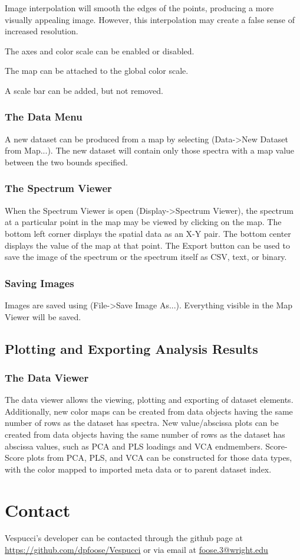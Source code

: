 \documentclass[12pt]{achemso} %
\begin{document}
Image interpolation will smooth the edges of the points, producing a more
visually appealing image. However, this interpolation may create a false sense
of increased resolution.

The axes and color scale can be enabled or disabled.

The map can be attached to the global color scale.

A scale bar can be added, but not removed.

\subsubsection{The Data Menu} A new dataset can be produced from a map by
selecting (Data->New Dataset from Map...). The new dataset will contain only
those spectra with a map value between the two bounds specified.

\subsubsection{The Spectrum Viewer} When the Spectrum Viewer is open
(Display->Spectrum Viewer), the spectrum at a particular point in the map may be
viewed by clicking on the map. The bottom left corner displays the spatial data
as an X-Y pair. The bottom center displays the value of the map at that point.
The Export button can be used to save the image of the spectrum or the spectrum
itself as CSV, text, or binary. 

\subsubsection{Saving Images} Images are saved
using (File->Save Image As...). Everything visible in the Map Viewer will be
saved.

\subsection{Plotting and Exporting Analysis Results}
\subsubsection{The Data Viewer}
The data viewer allows the viewing, plotting and exporting of dataset elements. Additionally, 
new color maps can be created from data objects having the same number of rows as the dataset has spectra.
 New value/abscissa plots can be created from data objects having the same number of rows as the dataset has 
abscissa values, such as PCA and PLS loadings and VCA endmembers.
 Score-Score plots from PCA, PLS, and VCA can be constructed for those data types, with the color mapped to 
imported meta data or to parent dataset index. 

\section{Contact}
Vespucci's developer can be contacted through the github page at \url{https://github.com/dpfoose/Vespucci} or via email
 at \url{foose.3@wright.edu}

 
\end{document}

